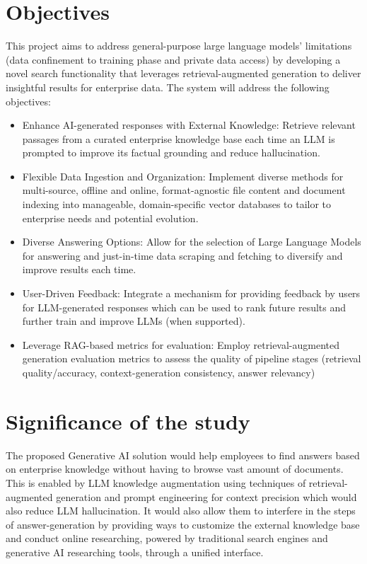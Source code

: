 \section{Objectives}
This project aims to address general-purpose large language models' limitations (data confinement to training phase and private data access) by developing a novel search functionality that leverages retrieval-augmented generation to deliver insightful results for enterprise data. The system will address the following objectives:
\begin{itemize}
    \item Enhance AI-generated responses with External Knowledge: Retrieve relevant passages from a curated enterprise knowledge base each time an LLM is prompted to improve its factual grounding and reduce hallucination.
    \item Flexible Data Ingestion and Organization: Implement diverse methods for multi-source, offline and online, format-agnostic file content and document indexing into manageable, domain-specific vector databases to tailor to enterprise needs and potential evolution.
    \item Diverse Answering Options: Allow for the selection of Large Language Models for answering and just-in-time data scraping and fetching to diversify and improve results each time.
    \item User-Driven Feedback: Integrate a mechanism for providing feedback by users for LLM-generated responses which can be used to rank future results and further train and improve LLMs (when supported).
    \item Leverage RAG-based metrics for evaluation: Employ retrieval-augmented generation evaluation metrics to assess the quality of pipeline stages (retrieval quality/accuracy, context-generation consistency, answer relevancy)
\end{itemize}
\newpage
\section{Significance of the study}
The proposed Generative AI solution would help employees to find answers based on enterprise knowledge without having to browse vast amount of documents. This is enabled by LLM knowledge augmentation using techniques of retrieval-augmented generation and prompt engineering for context precision which would also reduce LLM hallucination. It would also allow them to interfere in the steps of answer-generation by providing ways to customize the external knowledge base and conduct online researching, powered by traditional search engines and generative AI researching tools, through a unified interface.